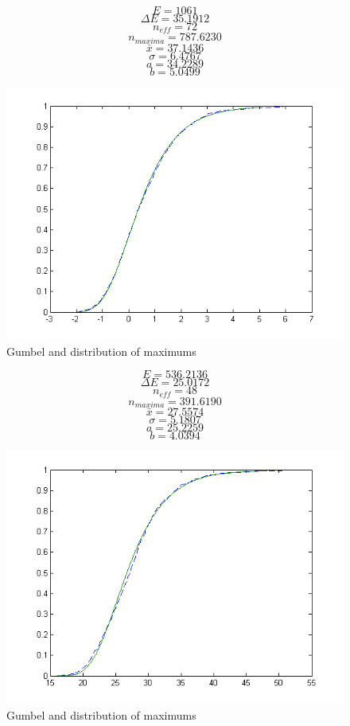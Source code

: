 \documentclass[12pt]{article}
\begin{document}
\[E = 1061\]
\[\Delta E = 35.1912\]
\[n_{eff} = 72\]
\[n_{maxima} = 787.6230\]
\[\bar{x} = 37.1436\]
\[\sigma = 6.4767\]
\[a = 34.2289\]
\[b = 5.0499\]

\begin{figure}[ht]
	\centering
		\includegraphics[width=1.00\textwidth]{notes3/gumbel_e2to10.png}
	\caption{Gumbel and distribution of maximums}
	\label{fig:gumbel_e2to10}
\end{figure}

\pagebreak

\[E = 536.2136\]
\[\Delta E = 25.0172\]
\[n_{eff} = 48\]
\[n_{maxima} = 391.6190\]
\[\bar{x} = 27.5574\]
\[\sigma = 5.1807\]
\[a = 25.2259\]
\[b = 4.0394\]

\begin{figure}[hbpt]
	\centering
		\includegraphics[width=1.00\textwidth]{eg9.png}
	\caption{Gumbel and distribution of maximums}
	\label{fig:eg9}
\end{figure}
\end{document}
